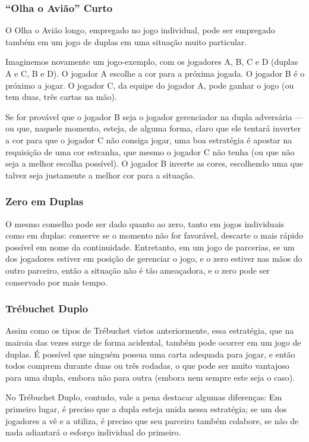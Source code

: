 \subsubsection{``Olha o Avião'' Curto}

O Olha o Avião longo, empregado no jogo individual, pode ser empregado também em um jogo de duplas em uma situação muito particular.

Imaginemos novamente um jogo-exemplo, com os jogadores A, B, C e D (duplas A e C, B e D). O jogador A escolhe a cor para a próxima jogada. O jogador B é o próximo a jogar. O jogador C, da equipe do jogador A, pode ganhar o jogo (ou tem duas, três cartas na mão).

Se for provável que o jogador B seja o jogador gerenciador na dupla adversária --- ou que, naquele momento, esteja, de alguma forma, claro que ele tentará inverter a cor para que o jogador C não consiga jogar, uma boa estratégia é apostar na requisição de uma cor estranha, que mesmo o jogador C não tenha (ou que não seja a melhor escolha possível). O jogador B inverte as cores, escolhendo uma que talvez seja justamente a melhor cor para a situação.

\subsubsection{Zero em Duplas}

O mesmo conselho pode ser dado quanto ao zero, tanto em jogos individuais como em duplas: conserve se o momento não for favorável, descarte o mais rápido possível em nome da continuidade. Entretanto, em um jogo de parcerias, se um dos jogadores estiver em posição de gerenciar o jogo, e o zero estiver nas mãos do outro parceiro, então a situação não é tão ameaçadora, e o zero pode ser conservado por mais tempo. 

\subsubsection{Trébuchet Duplo}

Assim como os tipos de Trébuchet vistos anteriormente, essa estratégia, que na mairoia das vezes surge de forma acidental, também pode ocorrer em um jogo de duplas. É possível que ninguém possua uma carta adequada para jogar, e então todos comprem durante duas ou três rodadas, o que pode ser muito vantajoso para uma dupla, embora não para outra (embora nem sempre este seja o caso).

No Trébuchet Duplo, contudo, vale a pena destacar algumas diferenças: Em primeiro lugar, é preciso que a dupla esteja unida nessa estratégia; se um dos jogadores a vê e a utiliza, é preciso que seu parceiro também colabore, se não de nada adiantará o esforço individual do primeiro.

